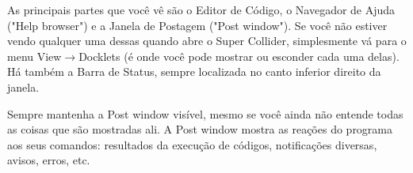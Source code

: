 As principais partes que você vê são o Editor de Código, o Navegador de Ajuda ("Help browser") e a Janela de Postagem ("Post window"). Se você não estiver vendo qualquer uma dessas quando abre o Super Collider, simplesmente vá para o menu View$\rightarrow$Docklets (é onde você pode mostrar ou esconder cada uma delas). Há também a Barra de Status, sempre localizada no canto inferior direito da janela.

Sempre mantenha a Post window visível, mesmo se você ainda não entende todas as coisas que são mostradas ali. A Post window mostra as reações do programa aos seus comandos: resultados da execução de códigos, notificações diversas, avisos, erros, etc.

\bigskip
{}
\bigskip


